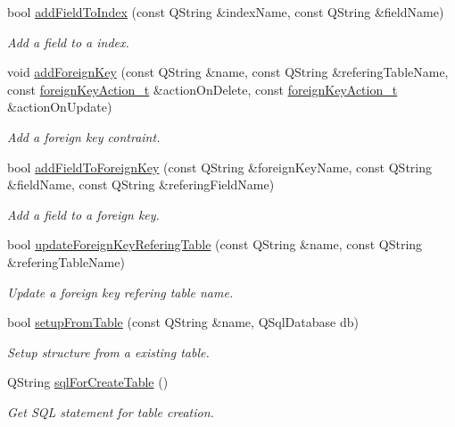 \begin{DoxyCompactItemize}
bool \hyperlink{classmdt_sql_schema_table_a3deb6f2b10178c252afbaabefb687722}{add\-Field\-To\-Index} (const Q\-String \&index\-Name, const Q\-String \&field\-Name)
\begin{DoxyCompactList}\small\item\em Add a field to a index. \end{DoxyCompactList}\item 
void \hyperlink{classmdt_sql_schema_table_a48ab41fda7864ec8cd59468de2475ff2}{add\-Foreign\-Key} (const Q\-String \&name, const Q\-String \&refering\-Table\-Name, const \hyperlink{classmdt_sql_schema_table_a1738e443f03dc69b914edb967cb911be}{foreign\-Key\-Action\-\_\-t} \&action\-On\-Delete, const \hyperlink{classmdt_sql_schema_table_a1738e443f03dc69b914edb967cb911be}{foreign\-Key\-Action\-\_\-t} \&action\-On\-Update)
\begin{DoxyCompactList}\small\item\em Add a foreign key contraint. \end{DoxyCompactList}\item 
bool \hyperlink{classmdt_sql_schema_table_a0909cc0e3ad602312ddf44de397d9fe4}{add\-Field\-To\-Foreign\-Key} (const Q\-String \&foreign\-Key\-Name, const Q\-String \&field\-Name, const Q\-String \&refering\-Field\-Name)
\begin{DoxyCompactList}\small\item\em Add a field to a foreign key. \end{DoxyCompactList}\item 
bool \hyperlink{classmdt_sql_schema_table_a652c5afd4af2965e8d5ead724dda3230}{update\-Foreign\-Key\-Refering\-Table} (const Q\-String \&name, const Q\-String \&refering\-Table\-Name)
\begin{DoxyCompactList}\small\item\em Update a foreign key refering table name. \end{DoxyCompactList}\item 
bool \hyperlink{classmdt_sql_schema_table_a2cea444ccb26b0802fb230db5460e167}{setup\-From\-Table} (const Q\-String \&name, Q\-Sql\-Database db)
\begin{DoxyCompactList}\small\item\em Setup structure from a existing table. \end{DoxyCompactList}\item 
Q\-String \hyperlink{classmdt_sql_schema_table_af6c605b7e7860ced2512792efda76357}{sql\-For\-Create\-Table} ()
\begin{DoxyCompactList}\small\item\em Get S\-Q\-L statement for table creation. \end{DoxyCompactList}\item 

\end{DoxyCompactItemize}
